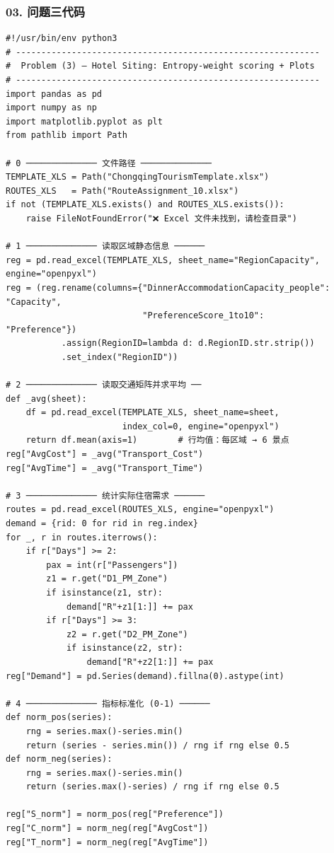 \documentclass[12pt,a4paper]{article}
\begin{document}
\subsubsection{03. 问题三代码}
\begin{lstlisting}
#!/usr/bin/env python3
# ------------------------------------------------------------
#  Problem (3) – Hotel Siting: Entropy‑weight scoring + Plots
# ------------------------------------------------------------
import pandas as pd
import numpy as np
import matplotlib.pyplot as plt
from pathlib import Path

# 0 ────────────── 文件路径 ──────────────
TEMPLATE_XLS = Path("ChongqingTourismTemplate.xlsx")
ROUTES_XLS   = Path("RouteAssignment_10.xlsx")
if not (TEMPLATE_XLS.exists() and ROUTES_XLS.exists()):
    raise FileNotFoundError("❌ Excel 文件未找到，请检查目录")

# 1 ────────────── 读取区域静态信息 ──────
reg = pd.read_excel(TEMPLATE_XLS, sheet_name="RegionCapacity", engine="openpyxl")
reg = (reg.rename(columns={"DinnerAccommodationCapacity_people": "Capacity",
                           "PreferenceScore_1to10":            "Preference"})
           .assign(RegionID=lambda d: d.RegionID.str.strip())
           .set_index("RegionID"))

# 2 ────────────── 读取交通矩阵并求平均 ──
def _avg(sheet):
    df = pd.read_excel(TEMPLATE_XLS, sheet_name=sheet,
                       index_col=0, engine="openpyxl")
    return df.mean(axis=1)        # 行均值：每区域 → 6 景点
reg["AvgCost"] = _avg("Transport_Cost")
reg["AvgTime"] = _avg("Transport_Time")

# 3 ────────────── 统计实际住宿需求 ──────
routes = pd.read_excel(ROUTES_XLS, engine="openpyxl")
demand = {rid: 0 for rid in reg.index}
for _, r in routes.iterrows():
    if r["Days"] >= 2:
        pax = int(r["Passengers"])
        z1 = r.get("D1_PM_Zone")
        if isinstance(z1, str):
            demand["R"+z1[1:]] += pax
        if r["Days"] >= 3:
            z2 = r.get("D2_PM_Zone")
            if isinstance(z2, str):
                demand["R"+z2[1:]] += pax
reg["Demand"] = pd.Series(demand).fillna(0).astype(int)

# 4 ────────────── 指标标准化 (0‑1) ──────
def norm_pos(series):
    rng = series.max()-series.min()
    return (series - series.min()) / rng if rng else 0.5
def norm_neg(series):
    rng = series.max()-series.min()
    return (series.max()-series) / rng if rng else 0.5

reg["S_norm"] = norm_pos(reg["Preference"])
reg["C_norm"] = norm_neg(reg["AvgCost"])
reg["T_norm"] = norm_neg(reg["AvgTime"])


\end{lstlisting}
\end{document}
